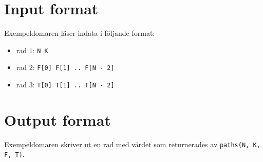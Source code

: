 \section*{Input format}
Exempeldomaren läser indata i följande format:

\begin{itemize}
  \item rad $1$: \texttt{N K}
  \item rad $2$: \texttt{F[0] F[1] .. F[N - 2]}
  \item rad $3$: \texttt{T[0] T[1] .. T[N - 2]}
\end{itemize}

\section*{Output format}
Exempeldomaren skriver ut en rad med värdet som returnerades av \texttt{paths(N, K, F, T)}.
